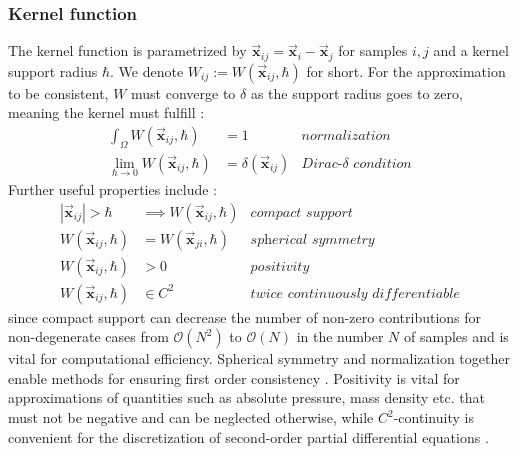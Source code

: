 \documentclass[oneside, a4paper]{book}
\newcommand\abs[1]{\left|#1\right|}
\newcommand\vek[1]{\vec{\bm{#1}}}
\newcommand\br[1]{\left(#1\right)}
\begin{document}
    \subsubsection{Kernel function}
    The kernel function is parametrized by $\vek{x}_{ij}=\vek{x}_i-\vek{x}_j$ for samples $i,j$ and a kernel support radius $\hbar$. We denote $W_{ij} := W(\vek{x}_{ij},\hbar) $ for short. For the approximation to be consistent, $W$ must converge to $\delta$ as the support radius goes to zero, meaning the kernel must fulfill \autocite{tutorial2019}:
    \begin{align}
      \int_\Omega W(\vek{x}_{ij},\hbar) &= 1 &\textit{normalization}\\
      \lim_{\hbar\rightarrow 0} W(\vek{x}_{ij},\hbar) &= \delta(\vek{x}_{ij}) &\textit{Dirac-$\delta$ condition}
    \end{align}
    Further useful properties include \autocite{tutorial2019}:
    \begin{align}
      \abs{\vek{x}_{ij}}>\hbar &\implies W(\vek{x}_{ij},\hbar) &\textit{compact support}\\
      W(\vek{x}_{ij},\hbar) &= W(\vek{x}_{ji}, \hbar) &\textit{spherical symmetry}\\
      W(\vek{x}_{ij},\hbar) &> 0 &\textit{positivity}\\
       W(\vek{x}_{ij},\hbar) &\in C^2 &\textit{twice continuously differentiable}
    \end{align}
    since compact support can decrease the number of non-zero contributions for non-degenerate cases from $\mathcal{O}\br{N^2}$ to $\mathcal{O}\br{N}$ in the number $N$ of samples and is vital for computational efficiency. Spherical symmetry and normalization together enable methods for ensuring first order consistency \autocite{tutorial2019}. Positivity is vital for approximations of quantities such as absolute pressure, mass density etc. that must not be negative and can be neglected otherwise, while $C^2$-continuity is convenient for the discretization of second-order partial differential equations \autocite{tutorial2019}.\\
\end{document}
